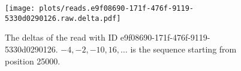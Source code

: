 \begin{figure}
\centering
\texttt{[image: plots/reads.e9f08690-171f-476f-9119-5330d0290126.raw.delta.pdf]}
	\caption[The deltas of the read with ID e9f08690-171f-476f-9119-5330d0290126.]{\label{fig:read-e9f-delta}The deltas of the read with ID e9f08690-171f-476f-9119-5330d0290126. $-4, -2, -10, 16,\dots$ is the sequence starting from position 25000.}
\end{figure}

